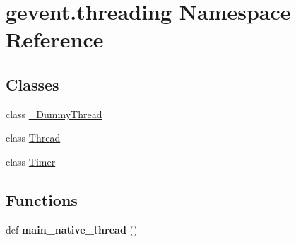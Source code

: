 \hypertarget{namespacegevent_1_1threading}{}\section{gevent.\+threading Namespace Reference}
\label{namespacegevent_1_1threading}
\subsection*{Classes}
\begin{DoxyCompactItemize}
\item 
class \hyperlink{classgevent_1_1threading_1_1___dummy_thread}{\+\_\+\+Dummy\+Thread}
\item 
class \hyperlink{classgevent_1_1threading_1_1_thread}{Thread}
\item 
class \hyperlink{classgevent_1_1threading_1_1_timer}{Timer}
\end{DoxyCompactItemize}
\subsection*{Functions}
\begin{DoxyCompactItemize}
\item 
\mbox{\label{namespacegevent_1_1threading_a474971d0c779037fc3d21a8510f76198}} 
def {\bfseries main\+\_\+native\+\_\+thread} ()
\end{DoxyCompactItemize}
